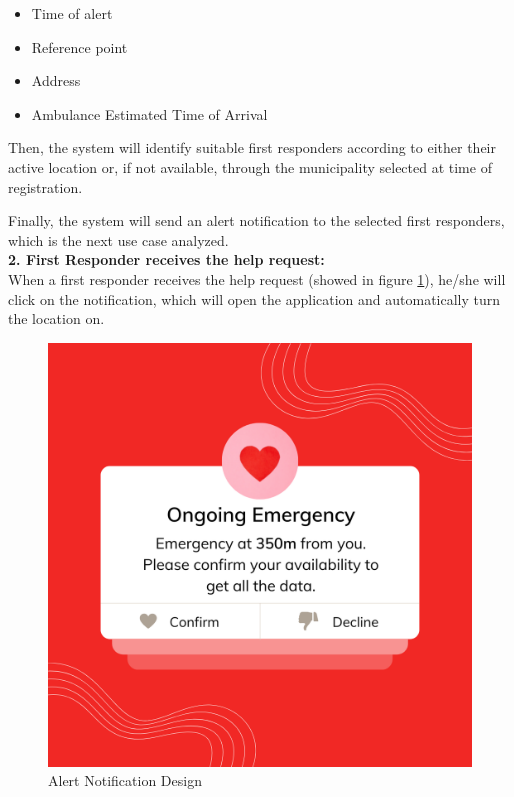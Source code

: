 \documentclass[11pt,a4paper]{article}
\begin{document}
\begin{itemize}
    \item Time of alert
    \item Reference point
    \item Address
    \item Ambulance Estimated Time of Arrival
\end{itemize}

Then, the system will identify suitable first responders according to either their active location or, if not available, through the municipality selected at time of registration.

Finally, the system will send an alert notification to the selected first responders, which is the next use case analyzed. \\

\textbf{2. First Responder receives the help request:} \\

When a first responder receives the help request (showed in figure \ref{fig:alert}), he/she will click on the notification, which will open the application and automatically turn the location on.

\begin{figure}[H]
    \centering
    \includegraphics[scale=0.25]{images/alert-notification.png}
    \caption{Alert Notification Design}
    \label{fig:alert}
\end{figure}
\end{document}

